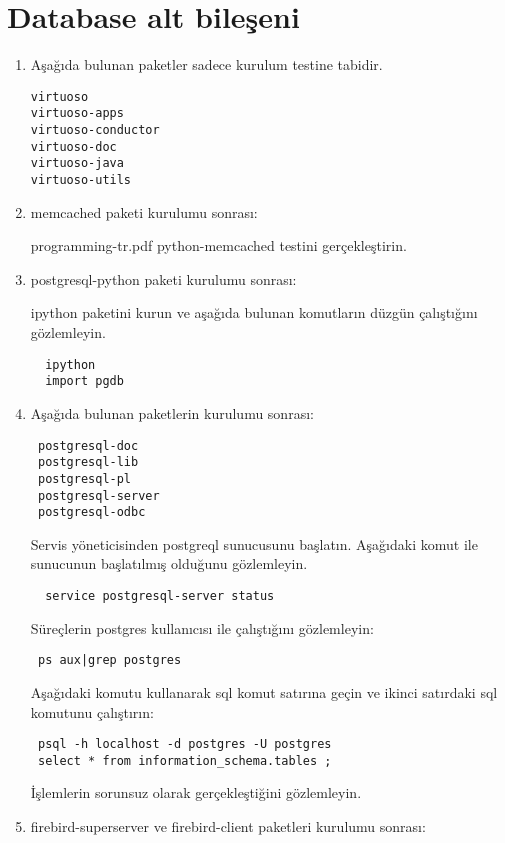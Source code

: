 \documentclass[a4paper,10pt]{article}
\begin{document}
\section{Database alt bileşeni}
\begin{enumerate}
\item Aşağıda bulunan paketler sadece kurulum testine tabidir.

\begin{verbatim}
virtuoso
virtuoso-apps
virtuoso-conductor
virtuoso-doc
virtuoso-java
virtuoso-utils
\end{verbatim}

\item memcached paketi kurulumu sonrası:

programming-tr.pdf python-memcached testini gerçekleştirin.

\item postgresql-python paketi kurulumu sonrası:

ipython paketini kurun ve aşağıda bulunan komutların düzgün çalıştığını gözlemleyin.
 \begin{verbatim}
  ipython
  import pgdb \end{verbatim}


 \item Aşağıda bulunan paketlerin kurulumu sonrası:
\begin{verbatim}
 postgresql-doc
 postgresql-lib
 postgresql-pl
 postgresql-server
 postgresql-odbc
\end{verbatim}

Servis yöneticisinden postgreql sunucusunu başlatın. Aşağıdaki komut ile sunucunun başlatılmış olduğunu gözlemleyin.
\begin{verbatim}
  service postgresql-server status
\end{verbatim}

Süreçlerin postgres kullanıcısı ile çalıştığını gözlemleyin:
\begin{verbatim}
 ps aux|grep postgres 
\end{verbatim}

Aşağıdaki komutu kullanarak sql komut satırına geçin ve ikinci satırdaki sql komutunu çalıştırın:
\begin{verbatim}
 psql -h localhost -d postgres -U postgres
 select * from information_schema.tables ;
\end{verbatim}

İşlemlerin sorunsuz olarak gerçekleştiğini gözlemleyin.

 \item firebird-superserver ve firebird-client paketleri kurulumu sonrası:


\end{enumerate}
\end{document}
